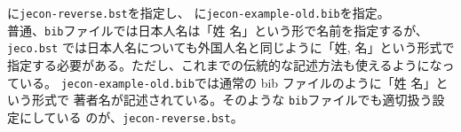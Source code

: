 \documentclass[10pt]{jarticle}
\begin{document}
\verb||に\verb|jecon-reverse.bst|を指定し、
\verb||に\verb|jecon-example-old.bib|を指定。
\vspace{1em}\\

普通、\verb|bib|ファイルでは日本人名は「姓 名」という形で名前を指定するが、
\verb|jeco.bst| では日本人名についても外国人名と同じように「姓, 名」という形式で
指定する必要がある。ただし、これまでの伝統的な記述方法も使えるようになっている。
\verb|jecon-example-old.bib|では通常の bib ファイルのように「姓 名」という形式で
著者名が記述されている。そのような \verb|bib|ファイルでも適切扱う設定にしている
のが、\verb|jecon-reverse.bst|。
\vspace{1em}\\



\nocite{*}


% 

%

\end{document}
